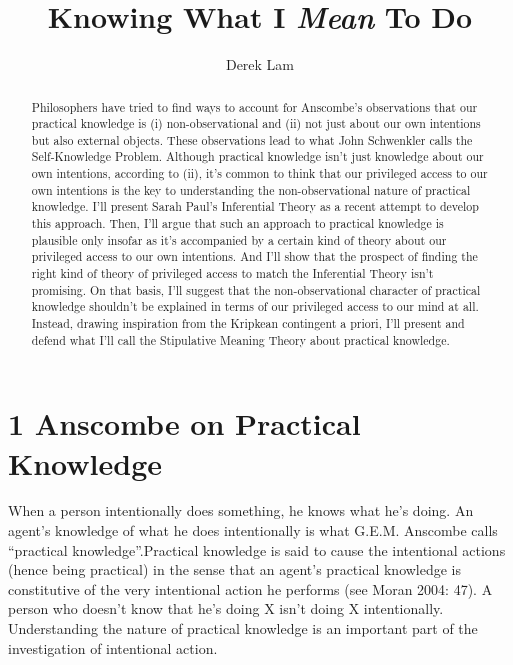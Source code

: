 \documentclass[a4paper,12pt]{article}
\title{\textbf{Knowing What I \emph{Mean} To Do}}
\author{Derek Lam}
\begin{document}
\maketitle

\begin{abstract}
Philosophers have tried to find ways to account for Anscombe's observations that our practical knowledge is (i) non-observational and (ii) not just about our own intentions but also external objects. These observations lead to what John Schwenkler calls the Self-Knowledge Problem. Although practical knowledge isn't just knowledge about our own intentions, according to (ii), it's common to think that our privileged access to our own intentions is the key to understanding the non-observational nature of practical knowledge. I'll present Sarah Paul's Inferential Theory as a recent attempt to develop this approach. Then, I'll argue that such an approach to practical knowledge is plausible only insofar as it's accompanied by a certain kind of theory about our privileged access to our own intentions. And I'll show that the prospect of finding the right kind of theory of privileged access to match the Inferential Theory isn't promising. On that basis, I'll suggest that the non-observational character of practical knowledge shouldn't be explained in terms of our privileged access to our mind at all. Instead, drawing inspiration from the Kripkean contingent a priori, I'll present and defend what I'll call the Stipulative Meaning Theory about practical knowledge.
\end{abstract}

\section*{1 Anscombe on Practical Knowledge}
When a person intentionally does something, he knows what he's doing. An agent's knowledge of what he does intentionally is what G.E.M. Anscombe calls ``practical knowledge''.\footnotemark Practical knowledge is said to cause the intentional actions (hence being practical) in the sense that an agent's practical knowledge is constitutive of the very intentional action he performs (see Moran 2004: 47). A person who doesn't know that he's doing X isn't doing X intentionally. Understanding the nature of practical knowledge is an important part of the investigation of intentional action.

	
\end{document}
